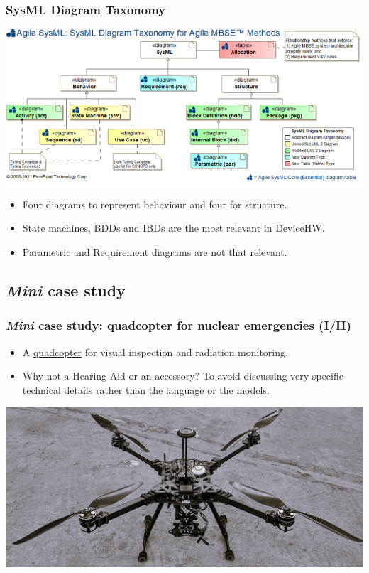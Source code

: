 \documentclass[xcolor=dvipsnames,t]{beamer}
\begin{document}
\begin{frame}
\frametitle {SysML Diagram Taxonomy}
\includegraphics[width=\textwidth]{DiagramTaxonomy.png}
\begin{itemize}
\item Four diagrams to represent behaviour and four for structure.
\item State machines, BDDs and IBDs are the most relevant in DeviceHW.
\item Parametric and Requirement diagrams are not that relevant.
\end{itemize}
\end{frame}

\subsection{\textit{Mini} case study}
\begin{frame}
\frametitle {\textit{Mini} case study: quadcopter for nuclear emergencies (I/II)}
\begin{itemize}
\item A \href{https://en.wikipedia.org/wiki/Quadcopter}{quadcopter} for visual inspection and radiation monitoring.
\item Why not a Hearing Aid or an accessory? To avoid discussing very specific technical details rather than the language or the models.
\end{itemize}

\includegraphics[width=\textwidth]{quadCopter.png}
\end{frame}
\end{document}
